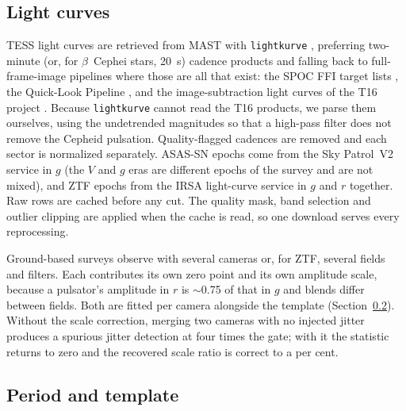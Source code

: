 \documentclass[final,5p]{elsarticle}
\newcommand{\bcep}{\ensuremath{\beta}~Cephei}
\begin{document}
\subsection{Light curves}
\label{sec:lightcurves}

TESS \citep{Ricker2015} light curves are retrieved from MAST with \texttt{lightkurve} \citep{Lightkurve2018}, preferring two-minute (or, for \bcep{} stars, 20~s) cadence products and falling back to full-frame-image pipelines where those are all that exist: the SPOC FFI target lists \citep{Caldwell2020}, the Quick-Look Pipeline \citep{Kunimoto2022}, and the image-subtraction light curves of the T16 project \citep{Hartman2025}. Because \texttt{lightkurve} cannot read the T16 products, we parse them ourselves, using the undetrended magnitudes so that a high-pass filter does not remove the Cepheid pulsation. Quality-flagged cadences are removed and each sector is normalized separately. ASAS-SN \citep{Shappee2014} epochs come from the Sky Patrol~V2 service \citep{Hart2023} in $g$ (the $V$ and $g$ eras are different epochs of the survey and are not mixed), and ZTF epochs from the IRSA light-curve service in $g$ and $r$ together. Raw rows are cached before any cut. The quality mask, band selection and outlier clipping are applied when the cache is read, so one download serves every reprocessing.

Ground-based surveys observe with several cameras or, for ZTF, several fields and filters. Each contributes its own zero point and its own amplitude scale, because a pulsator's amplitude in $r$ is $\sim$0.75 of that in $g$ and blends differ between fields. Both are fitted per camera alongside the template (Section~\ref{sec:template}). Without the scale correction, merging two cameras with no injected jitter produces a spurious jitter detection at four times the gate; with it the statistic returns to zero and the recovered scale ratio is correct to a per cent.

\subsection{Period and template}
\label{sec:template}
\end{document}
